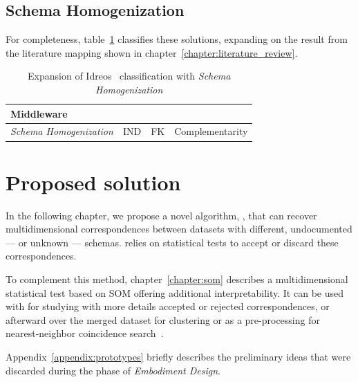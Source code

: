\subsection{Schema Homogenization}

For completeness, table~\ref{tab:missing_middleware} classifies these solutions,
expanding on the result from the literature mapping shown in chapter~\ref{chapter:literature_review}.

\begin{table}[ht]
    \centering
    \begin{tabularx}{\linewidth}{p{7em} >{\raggedright}X >{\raggedright}X X}
    \hline
    \multicolumn{4}{l}{\textbf{Middleware}} \\
    \hline
    \textit{Schema \mbox{Homogenization}} &
    \gls{IND}     \cite{DeMarchi2002,DeMarchi2003zigzag,koeller2002integration} &
    \gls{FK}      \cite{Rostin2009,Zhang2010,jiang_holistic_2020} &
    Complementarity \cite{alawini2016} \\
    \hline
    \end{tabularx}
    \caption[Articles under Schema Homogenization]{
    Expansion of Idreos~\cite{Idreos2015} classification with \emph{Schema Homogenization}}
    \label{tab:missing_middleware}
\end{table}


\section{Proposed solution}
In the following chapter, we propose a novel algorithm, \PresQ, that
can recover multidimensional correspondences between datasets with different,
undocumented --- or unknown --- schemas. \PresQ relies on statistical tests to
accept or discard these correspondences.

To complement this method, chapter~\ref{chapter:som} describes a multidimensional
statistical test based on \gls{SOM} offering additional interpretability. It can be
used with \PresQ for studying with more details accepted or rejected correspondences,
or afterward over the merged dataset for clustering or as a pre-processing for nearest-neighbor
coincidence search~\cite{silva2011som}.

Appendix~\ref{appendix:prototypes} briefly describes the preliminary ideas that were
discarded during the phase of \emph{Embodiment Design}.
